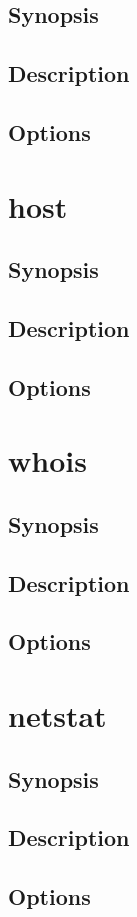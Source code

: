 \documentclass[a4paper, 10pt, onecolumn, openright, oneside]{book}
\begin{document}
			\subsection{Synopsis}
			\subsection{Description}
			\subsection{Options}
		\section{host}
			\subsection{Synopsis}
			\subsection{Description}
			\subsection{Options}
		\section{whois}
			\subsection{Synopsis}
			\subsection{Description}
			\subsection{Options}
		\section{netstat}
			\subsection{Synopsis}
			\subsection{Description}
			\subsection{Options}
\end{document}
